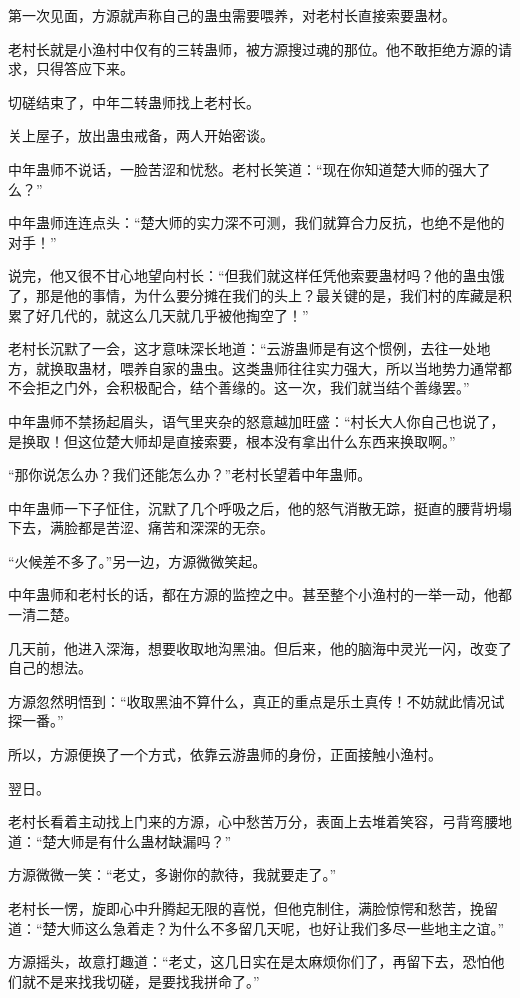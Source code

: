 \begin{this_body}
第一次见面，方源就声称自己的蛊虫需要喂养，对老村长直接索要蛊材。

老村长就是小渔村中仅有的三转蛊师，被方源搜过魂的那位。他不敢拒绝方源的请求，只得答应下来。

切磋结束了，中年二转蛊师找上老村长。

关上屋子，放出蛊虫戒备，两人开始密谈。

中年蛊师不说话，一脸苦涩和忧愁。老村长笑道：“现在你知道楚大师的强大了么？”

中年蛊师连连点头：“楚大师的实力深不可测，我们就算合力反抗，也绝不是他的对手！”

说完，他又很不甘心地望向村长：“但我们就这样任凭他索要蛊材吗？他的蛊虫饿了，那是他的事情，为什么要分摊在我们的头上？最关键的是，我们村的库藏是积累了好几代的，就这么几天就几乎被他掏空了！”

老村长沉默了一会，这才意味深长地道：“云游蛊师是有这个惯例，去往一处地方，就换取蛊材，喂养自家的蛊虫。这类蛊师往往实力强大，所以当地势力通常都不会拒之门外，会积极配合，结个善缘的。这一次，我们就当结个善缘罢。”

中年蛊师不禁扬起眉头，语气里夹杂的怒意越加旺盛：“村长大人你自己也说了，是换取！但这位楚大师却是直接索要，根本没有拿出什么东西来换取啊。”

“那你说怎么办？我们还能怎么办？”老村长望着中年蛊师。

中年蛊师一下子怔住，沉默了几个呼吸之后，他的怒气消散无踪，挺直的腰背坍塌下去，满脸都是苦涩、痛苦和深深的无奈。

“火候差不多了。”另一边，方源微微笑起。

中年蛊师和老村长的话，都在方源的监控之中。甚至整个小渔村的一举一动，他都一清二楚。

几天前，他进入深海，想要收取地沟黑油。但后来，他的脑海中灵光一闪，改变了自己的想法。

方源忽然明悟到：“收取黑油不算什么，真正的重点是乐土真传！不妨就此情况试探一番。”

所以，方源便换了一个方式，依靠云游蛊师的身份，正面接触小渔村。

翌日。

老村长看着主动找上门来的方源，心中愁苦万分，表面上去堆着笑容，弓背弯腰地道：“楚大师是有什么蛊材缺漏吗？”

方源微微一笑：“老丈，多谢你的款待，我就要走了。”

老村长一愣，旋即心中升腾起无限的喜悦，但他克制住，满脸惊愕和愁苦，挽留道：“楚大师这么急着走？为什么不多留几天呢，也好让我们多尽一些地主之谊。”

方源摇头，故意打趣道：“老丈，这几日实在是太麻烦你们了，再留下去，恐怕他们就不是来找我切磋，是要找我拼命了。”


\end{this_body}
